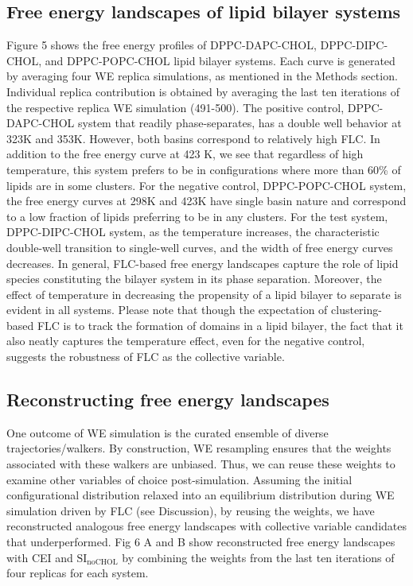 \documentclass{biophys-new}
\begin{document}
\subsection*{Free energy landscapes of lipid bilayer systems}

Figure 5 shows the free energy profiles of DPPC-DAPC-CHOL, DPPC-DIPC-CHOL, and DPPC-POPC-CHOL lipid bilayer systems.
Each curve is generated by averaging four WE replica simulations, as mentioned in the Methods section.
Individual replica contribution is obtained by averaging the last ten iterations of the respective replica WE simulation (491-500). 
The positive control, DPPC-DAPC-CHOL system that readily phase-separates, has a double well behavior at 323K and 353K.
However, both basins correspond to relatively high FLC.
In addition to the free energy curve at 423 K, we see that regardless of high temperature, this system prefers to be in configurations where more than 60\% of lipids are in some clusters.
For the negative control, DPPC-POPC-CHOL system, the free energy curves at 298K and 423K have single basin nature and correspond to a low fraction of lipids preferring to be in any clusters.
For the test system, DPPC-DIPC-CHOL system, as the temperature increases, the characteristic double-well transition to single-well curves, and the width of free energy curves decreases.
In general, FLC-based free energy landscapes capture the role of lipid species constituting the bilayer system in its phase separation.
Moreover, the effect of temperature in decreasing the propensity of a lipid bilayer to separate is evident in all systems.
Please note that though the expectation of clustering-based FLC is to track the formation of domains in a lipid bilayer, the fact that it also neatly captures the temperature effect, even for the negative control, suggests the robustness of FLC as the collective variable.

\subsection*{Reconstructing free energy landscapes}
One outcome of WE simulation is the curated ensemble of diverse trajectories/walkers.
By construction, WE resampling ensures that the weights associated with these walkers are unbiased.
Thus, we can reuse these weights to examine other variables of choice post-simulation.
Assuming the initial configurational distribution relaxed into an equilibrium distribution during WE simulation driven by FLC (see Discussion), 
by reusing the weights, we have reconstructed analogous free energy landscapes with collective variable candidates that underperformed.
Fig 6 A and B show reconstructed free energy landscapes with CEI and $\text{SI}_{\text{noCHOL}}$ by combining the weights from the last ten iterations of four replicas for each system.
\end{document}
